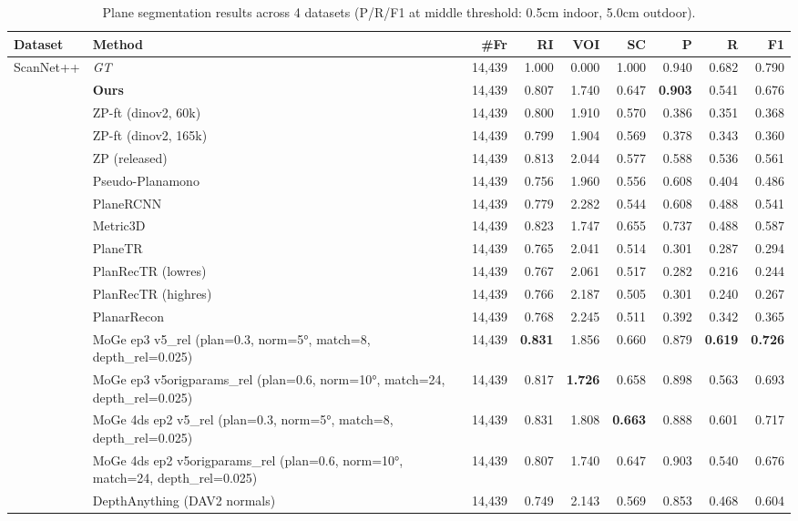 \begin{table}[t]
\centering
\caption{Plane segmentation results across 4 datasets (P/R/F1 at middle threshold: 0.5cm indoor, 5.0cm outdoor).}
\label{tab:combined_compact}
\begin{tabular}{l l r r r r r r r}
\toprule
Dataset & Method & \#Fr & RI & VOI & SC & P & R & F1 \\
\midrule
ScanNet++ & \textit{GT} & 14,439 & 1.000 & 0.000 & 1.000 & 0.940 & 0.682 & 0.790 \\
 & \textbf{Ours} & 14,439 & 0.807 & 1.740 & 0.647 & \textbf{0.903} & 0.541 & 0.676 \\
 & ZP-ft (dinov2, 60k) & 14,439 & 0.800 & 1.910 & 0.570 & 0.386 & 0.351 & 0.368 \\
 & ZP-ft (dinov2, 165k) & 14,439 & 0.799 & 1.904 & 0.569 & 0.378 & 0.343 & 0.360 \\
 & ZP (released) & 14,439 & 0.813 & 2.044 & 0.577 & 0.588 & 0.536 & 0.561 \\
 & Pseudo-Planamono & 14,439 & 0.756 & 1.960 & 0.556 & 0.608 & 0.404 & 0.486 \\
 & PlaneRCNN & 14,439 & 0.779 & 2.282 & 0.544 & 0.608 & 0.488 & 0.541 \\
 & Metric3D & 14,439 & 0.823 & 1.747 & 0.655 & 0.737 & 0.488 & 0.587 \\
 & PlaneTR & 14,439 & 0.765 & 2.041 & 0.514 & 0.301 & 0.287 & 0.294 \\
 & PlanRecTR (lowres) & 14,439 & 0.767 & 2.061 & 0.517 & 0.282 & 0.216 & 0.244 \\
 & PlanRecTR (highres) & 14,439 & 0.766 & 2.187 & 0.505 & 0.301 & 0.240 & 0.267 \\
 & PlanarRecon & 14,439 & 0.768 & 2.245 & 0.511 & 0.392 & 0.342 & 0.365 \\
 & MoGe ep3 v5\_rel (plan=0.3, norm=5°, match=8, depth\_rel=0.025) & 14,439 & \textbf{0.831} & 1.856 & 0.660 & 0.879 & \textbf{0.619} & \textbf{0.726} \\
 & MoGe ep3 v5origparams\_rel (plan=0.6, norm=10°, match=24, depth\_rel=0.025) & 14,439 & 0.817 & \textbf{1.726} & 0.658 & 0.898 & 0.563 & 0.693 \\
 & MoGe 4ds ep2 v5\_rel (plan=0.3, norm=5°, match=8, depth\_rel=0.025) & 14,439 & 0.831 & 1.808 & \textbf{0.663} & 0.888 & 0.601 & 0.717 \\
 & MoGe 4ds ep2 v5origparams\_rel (plan=0.6, norm=10°, match=24, depth\_rel=0.025) & 14,439 & 0.807 & 1.740 & 0.647 & 0.903 & 0.540 & 0.676 \\
 & DepthAnything (DAV2 normals) & 14,439 & 0.749 & 2.143 & 0.569 & 0.853 & 0.468 & 0.604 \\

\end{tabular}
\end{table}
